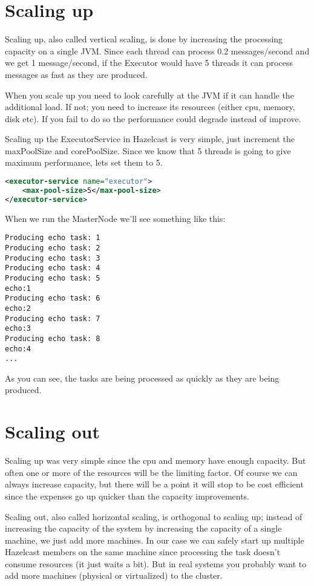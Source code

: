 \section{Scaling up}
Scaling up, also called vertical scaling, is done by increasing the processing capacity on a single JVM. Since each thread can process 0.2 messages/second and we get 1 message/second, if the Executor would have 5 threads it can process messages as fast as they are produced.

When you scale up you need to look carefully at the JVM if it can handle the additional load. If not; you need to increase its resources (either cpu, memory, disk etc). If you fail to do so the performance could degrade instead of improve. 

Scaling up the ExecutorService in Hazelcast is very simple, just increment the maxPoolSize and corePoolSize. Since we know that 5 threads is going to give maximum performance, lets set them to 5.
\begin{lstlisting}[language=xml]
<executor-service name="executor">
    <max-pool-size>5</max-pool-size>
</executor-service>
\end{lstlisting}
When we run the MasterNode we'll see something like this:
\begin{lstlisting}
Producing echo task: 1
Producing echo task: 2
Producing echo task: 3
Producing echo task: 4
Producing echo task: 5
echo:1
Producing echo task: 6
echo:2
Producing echo task: 7
echo:3
Producing echo task: 8
echo:4
...
\end{lstlisting}
As you can see, the tasks are being processed as quickly as they are being produced. 

\section{Scaling out}
Scaling up was very simple since the cpu and memory have enough capacity. But often one or more of the resources will be the limiting factor. Of course we can always increase capacity, but there will be a point it will stop to be cost efficient since the expenses go up quicker than the capacity improvements.

Scaling out, also called horizontal scaling, is orthogonal to scaling up; instead of increasing the capacity of the system by increasing the capacity of a single machine, we just add more machines. In our case we can safely start up multiple Hazelcast members on the same machine since processing the task doesn't consume resources (it just waits a bit). But in real systems you probably want to add more machines (physical or virtualized) to the cluster.


